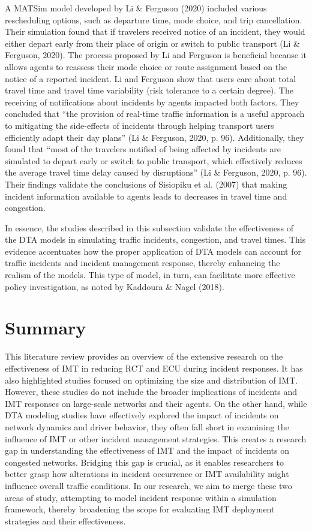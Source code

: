 \documentclass[fancy, oneside, mastersfancy, ms]{byuthesis}
\begin{document}
A MATSim model developed by Li \& Ferguson (2020) included various
rescheduling options, such as departure time, mode choice, and trip
cancellation. Their simulation found that if travelers received notice
of an incident, they would either depart early from their place of
origin or switch to public transport (Li \& Ferguson, 2020). The process
proposed by Li and Ferguson is beneficial because it allows agents to
reassess their mode choice or route assignment based on the notice of a
reported incident. Li and Ferguson show that users care about total
travel time and travel time variability (risk tolerance to a certain
degree). The receiving of notifications about incidents by agents
impacted both factors. They concluded that ``the provision of real-time
traffic information is a useful approach to mitigating the side-effects
of incidents through helping transport users efficiently adapt their day
plans'' (Li \& Ferguson, 2020, p. 96). Additionally, they found that
``most of the travelers notified of being affected by incidents are
simulated to depart early or switch to public transport, which
effectively reduces the average travel time delay caused by
disruptions'' (Li \& Ferguson, 2020, p. 96). Their findings validate the
conclusions of Sisiopiku et al. (2007) that making incident information
available to agents leads to decreases in travel time and congestion.

In essence, the studies described in this subsection validate the
effectiveness of the DTA models in simulating traffic incidents,
congestion, and travel times. This evidence accentuates how the proper
application of DTA models can account for traffic incidents and incident
management response, thereby enhancing the realism of the models. This
type of model, in turn, can facilitate more effective policy
investigation, as noted by Kaddoura \& Nagel (2018).

\hypertarget{summary}{%
\section{Summary}\label{summary}}

This literature review provides an overview of the extensive research on
the effectiveness of IMT in reducing RCT and ECU during incident
responses. It has also highlighted studies focused on optimizing the
size and distribution of IMT. However, these studies do not include the
broader implications of incidents and IMT responses on large-scale
networks and their agents. On the other hand, while DTA modeling studies
have effectively explored the impact of incidents on network dynamics
and driver behavior, they often fall short in examining the influence of
IMT or other incident management strategies. This creates a research gap
in understanding the effectiveness of IMT and the impact of incidents on
congested networks. Bridging this gap is crucial, as it enables
researchers to better grasp how alterations in incident occurrence or
IMT availability might influence overall traffic conditions. In our
research, we aim to merge these two areas of study, attempting to model
incident response within a simulation framework, thereby broadening the
scope for evaluating IMT deployment strategies and their effectiveness.
\end{document}
